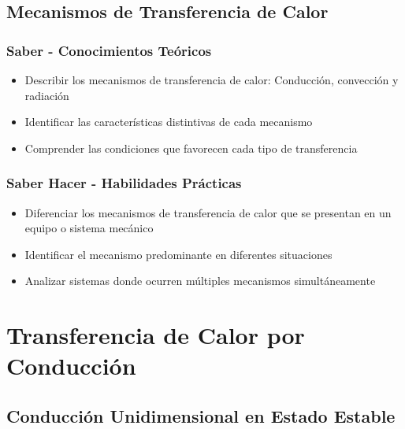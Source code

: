 \documentclass[12pt,a4paper,twoside]{book}
\begin{document}
	\section{Mecanismos de Transferencia de Calor}
	\label{sec:mecanismos_transferencia}
	
	\subsection{Saber - Conocimientos Teóricos}
	\begin{saberbox}
		\begin{itemize}
			\item Describir los mecanismos de transferencia de calor: Conducción, convección y radiación
			\item Identificar las características distintivas de cada mecanismo
			\item Comprender las condiciones que favorecen cada tipo de transferencia
		\end{itemize}
	\end{saberbox}
	
	\subsection{Saber Hacer - Habilidades Prácticas}
	\begin{hacerbox}
		\begin{itemize}
			\item Diferenciar los mecanismos de transferencia de calor que se presentan en un equipo o sistema mecánico
			\item Identificar el mecanismo predominante en diferentes situaciones
			\item Analizar sistemas donde ocurren múltiples mecanismos simultáneamente
		\end{itemize}
	\end{hacerbox}
	
	\chapter{Transferencia de Calor por Conducción}
	\label{chap:conduccion}
	
	\section{Conducción Unidimensional en Estado Estable}
	\label{sec:conduccion_estable}
	
\end{document}

